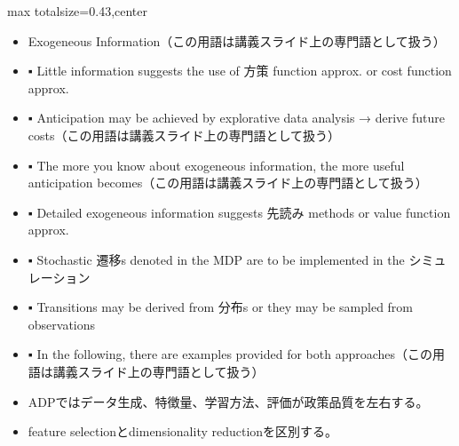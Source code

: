 \clearpage
{}
\begin{minipage}[t]{0.405\textwidth}
\begin{adjustbox}{max totalsize={\textwidth}{0.43\textheight},center}
\begin{minipage}{\textwidth}\scriptsize
{}\begin{itemize}
\item Exogeneous Information（この用語は講義スライド上の専門語として扱う）
\item ▪ Little information suggests the use of 方策 function approx. or cost function approx.
\item ▪ Anticipation may be achieved by explorative data analysis → derive future costs（この用語は講義スライド上の専門語として扱う）
\item ▪ The more you know about exogeneous information, the more useful anticipation becomes（この用語は講義スライド上の専門語として扱う）
\item ▪ Detailed exogeneous information suggests 先読み methods or value function approx.
\item ▪ Stochastic 遷移s denoted in the MDP are to be implemented in the シミュレーション
\item ▪ Transitions may be derived from 分布s or they may be sampled from observations
\item ▪ In the following, there are examples provided for both approaches（この用語は講義スライド上の専門語として扱う）
\end{itemize}\begin{itemize}
\item ADPではデータ生成、特徴量、学習方法、評価が政策品質を左右する。
\item feature selectionとdimensionality reductionを区別する。
\end{itemize}
\end{minipage}
\end{adjustbox}
\end{minipage}\hfill
